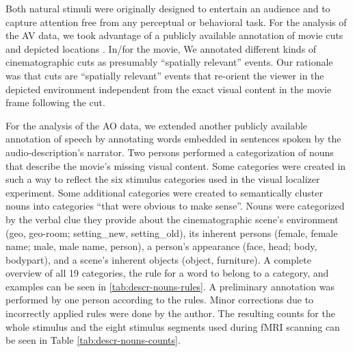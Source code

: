 \documentclass[english]{article}
\begin{document}
Both natural stimuli were originally designed to entertain an audience and to
capture attention free from any perceptual or behavioral task.
For the analysis of the AV data, we took advantage of a publicly available
annotation of movie cuts and depicted locations \citep{haeusler2016cutanno}.
In/for the movie, We annotated different kinds of cinematographic cuts
\citep{haeusler2016cutanno} as presumably ``spatially relevant'' events.
Our rationale was that cuts are ``spatially relevant'' events that re-orient the
viewer in the depicted environment independent from the exact visual content in
the movie frame following the cut.

For the analysis of the AO data, we extended another publicly available
annotation of speech \citep{haeusler2020speechanno} by annotating words embedded
in sentences spoken by the audio-description's narrator.
Two persons performed a categorization of nouns that describe the movie's
missing visual content.
Some categories were created in such a way to reflect the six stimulus
categories used in the visual localizer experiment.
Some additional categories were created to semantically cluster nouns into
categories ``that were obvious to make sense''.
Nouns were categorized by the verbal clue they provide about the
cinematographic scene's environment (geo, geo-room; setting\_new, setting\_old),
its inherent persons (female, female name; male, male name, person), a person's
appearance (face, head; body, bodypart), and a scene's inherent objects (object,
furniture).
A complete overview of all 19 categories, the rule for a word to belong to a
category, and examples can be seen in \ref{tab:descr-nouns-rules}.
A preliminary annotation was performed by one person according to the rules.
Minor corrections due to incorrectly applied rules were done by the author.
The resulting counts for the whole stimulus and the eight stimulus
segments used during fMRI scanning can be seen in Table \ref{tab:descr-nouns-counts}.


\end{document}
